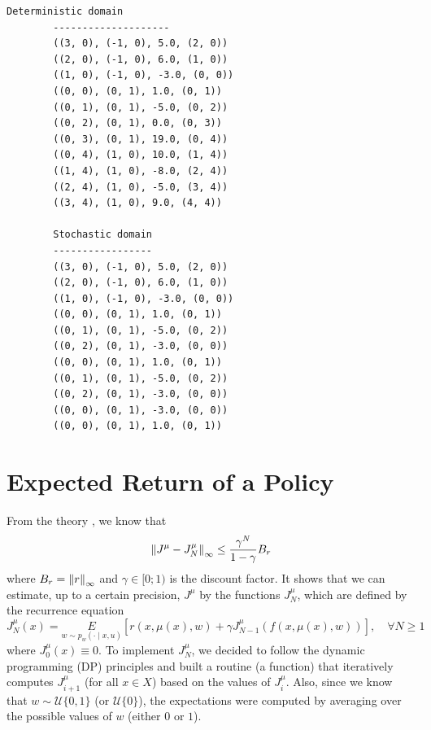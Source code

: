 \documentclass[a4paper, 12pt]{article}
\begin{document}
    \begin{lstlisting}[style=defaultFrameTB, gobble=8, caption={Simulated trajectories by applying policy \eqref{eq:clockwise.policy} in both domains.}, label={lst:simulated.domains}]
        Deterministic domain
        --------------------
        ((3, 0), (-1, 0), 5.0, (2, 0))
        ((2, 0), (-1, 0), 6.0, (1, 0))
        ((1, 0), (-1, 0), -3.0, (0, 0))
        ((0, 0), (0, 1), 1.0, (0, 1))
        ((0, 1), (0, 1), -5.0, (0, 2))
        ((0, 2), (0, 1), 0.0, (0, 3))
        ((0, 3), (0, 1), 19.0, (0, 4))
        ((0, 4), (1, 0), 10.0, (1, 4))
        ((1, 4), (1, 0), -8.0, (2, 4))
        ((2, 4), (1, 0), -5.0, (3, 4))
        ((3, 4), (1, 0), 9.0, (4, 4))
        
        Stochastic domain
        -----------------
        ((3, 0), (-1, 0), 5.0, (2, 0))
        ((2, 0), (-1, 0), 6.0, (1, 0))
        ((1, 0), (-1, 0), -3.0, (0, 0))
        ((0, 0), (0, 1), 1.0, (0, 1))
        ((0, 1), (0, 1), -5.0, (0, 2))
        ((0, 2), (0, 1), -3.0, (0, 0))
        ((0, 0), (0, 1), 1.0, (0, 1))
        ((0, 1), (0, 1), -5.0, (0, 2))
        ((0, 2), (0, 1), -3.0, (0, 0))
        ((0, 0), (0, 1), -3.0, (0, 0))
        ((0, 0), (0, 1), 1.0, (0, 1))
    \end{lstlisting}
    
    \section{Expected Return of a Policy}
    
    From the theory \cite{ernstinfo8003}, we know that
    \begin{equation}
        \left\|J^\mu - J^\mu_N\right\|_\infty \leq \frac{\gamma^{N}}{1 - \gamma} B_{r}
    \end{equation}
    where $B_r = \left\|r\right\|_\infty$ and $\gamma \in [0; 1)$ is the discount factor.
    It shows that we can estimate, up to a certain precision, $J^{\mu}$ by the functions $J^{\mu}_N$, which are defined by the recurrence equation
    \begin{equation}\label{eq:j.formulae}
        J^{\mu}_N(x) = \underset{w \sim p_{w}(\cdot \mid x, u)}{E}\left[r(x, \mu(x), w) + \gamma J^{\mu}_{N-1}(f(x, \mu(x), w))\right], \quad \forall N \geq 1
    \end{equation}
    where $J^{\mu}_0(x) \equiv 0$. To implement $J^\mu_N$, we decided to follow the dynamic programming (DP) principles and built a routine (a function) that iteratively computes $J^\mu_{i + 1}$ (for all $x \in X$) based on the values of $J^\mu_i$. Also, since we know that $w \sim \mathcal{U}\{0, 1\}$ (or $\mathcal{U}\{0\}$), the expectations were computed by averaging over the possible values of $w$ (either $0$ or $1$).
    
\end{document}
